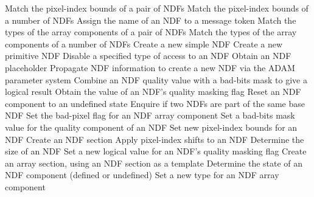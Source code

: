 \documentclass[twoside,11pt,nolof]{starlink}
\begin{document}
{\begin{description}{\addtolength{\itemindent}{-8mm}}
            {Match the pixel-index bounds of a pair of NDFs}
            {Match the pixel-index bounds of a number of NDFs}
            {Assign the name of an NDF to a message token}
            {Match the types of the array components of a pair of NDFs}
            {Match the types of the array components of a number of NDFs}
            {Create a new simple NDF}
            {Create a new primitive NDF}
            {Disable a specified type of access to an NDF}
            {Obtain an NDF placeholder}
            {Propagate NDF information to create a new NDF via the ADAM parameter system}
            {Combine an NDF quality value with a bad-bits mask to give a logical result}
            {Obtain the value of an NDF's quality masking flag}
            {Reset an NDF component to an undefined state}
            {Enquire if two NDFs are part of the same base NDF}
            {Set the bad-pixel flag for an NDF array component}
            {Set a bad-bits mask value for the quality component of an NDF}
            {Set new pixel-index bounds for an NDF}
            {Create an NDF section}
            {Apply pixel-index shifts to an NDF}
            {Determine the size of an NDF}
            {Set a new logical value for an NDF's quality masking flag}
            {Create an array section, using an NDF section as a template}
            {Determine the state of an NDF component (defined or undefined)}
            {Set a new type for an NDF array component}

\end{description}}
\end{document}
